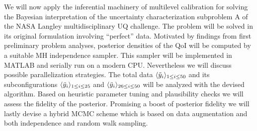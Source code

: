 We will now apply the inferential machinery of multilevel calibration for solving the Bayesian interpretation of the uncertainty characterization subproblem A of the NASA Langley multidisciplinary UQ challenge.
The problem will be solved in its original formulation involving ``perfect'' data.
Motivated by findings from first preliminary problem analyses, posterior densities of the QoI will be computed by a suitable MH independence sampler.
This sampler will be implemented in MATLAB and serially run on a modern CPU.
Nevertheless we will discuss possible parallelization strategies.
The total data \(\langle{\tilde{y}_i}\rangle_{1 \leq i \leq 50}\) and its subconfigurations \(\langle{\tilde{y}_i}\rangle_{1 \leq i \leq 25}\)
and \(\langle{\tilde{y}_i}\rangle_{26 \leq i \leq 50}\) will be analyzed with the devised algorithm.
Based on heuristic parameter tuning and plausibility checks we will assess the fidelity of the posterior.
Promising a boost of posterior fidelity we will lastly devise a hybrid MCMC scheme which is based on data augmentation and both independence and random walk sampling.

